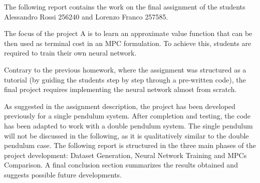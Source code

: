 
The following report contains the work on the final assignment of the students Alessandro Rossi 256240 and Lorenzo Franco 257585.

\noindent The focus of the project A is to learn an approximate value function that can be then used as terminal cost in an MPC formulation. To achieve this, students are required to train their own neural network.

\noindent Contrary to the previous homework, where the assignment was structured as a tutorial (by guiding the students step by step through a pre-written code), the final project requires implementing the neural network almost from scratch.

\noindent As suggested in the assignment description, the project has been developed previously for a single pendulum system. After completion and testing, the code has been adapted to work with a double pendulum system. The single pendulum will not be discussed in the following, as it is qualitatively similar to the double pendulum case. The following report is structured in the three main phases of the project development: Dataset Generation, Neural Network Training and MPCs Comparison. A final conclusion section summarizes the results obtained and suggests possible future developments.




